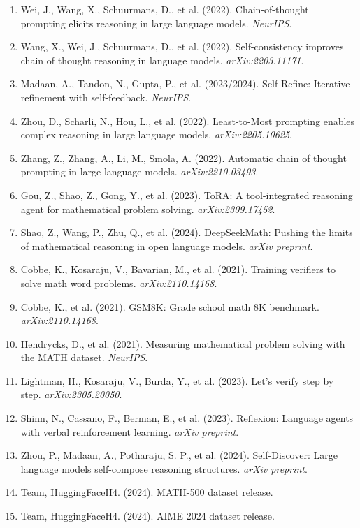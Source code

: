 \documentclass[11pt]{article}
\begin{document}
\begin{enumerate}[leftmargin=*]
    \item Wei, J., Wang, X., Schuurmans, D., et al. (2022). Chain-of-thought prompting elicits reasoning in large language models. \textit{NeurIPS}.
    \item Wang, X., Wei, J., Schuurmans, D., et al. (2022). Self-consistency improves chain of thought reasoning in language models. \textit{arXiv:2203.11171}.
    \item Madaan, A., Tandon, N., Gupta, P., et al. (2023/2024). Self-Refine: Iterative refinement with self-feedback. \textit{NeurIPS}.
    \item Zhou, D., Scharli, N., Hou, L., et al. (2022). Least-to-Most prompting enables complex reasoning in large language models. \textit{arXiv:2205.10625}.
    \item Zhang, Z., Zhang, A., Li, M., Smola, A. (2022). Automatic chain of thought prompting in large language models. \textit{arXiv:2210.03493}.
    \item Gou, Z., Shao, Z., Gong, Y., et al. (2023). ToRA: A tool-integrated reasoning agent for mathematical problem solving. \textit{arXiv:2309.17452}.
    \item Shao, Z., Wang, P., Zhu, Q., et al. (2024). DeepSeekMath: Pushing the limits of mathematical reasoning in open language models. \textit{arXiv preprint}.
    \item Cobbe, K., Kosaraju, V., Bavarian, M., et al. (2021). Training verifiers to solve math word problems. \textit{arXiv:2110.14168}.
    \item Cobbe, K., et al. (2021). GSM8K: Grade school math 8K benchmark. \textit{arXiv:2110.14168}.
    \item Hendrycks, D., et al. (2021). Measuring mathematical problem solving with the MATH dataset. \textit{NeurIPS}.
    \item Lightman, H., Kosaraju, V., Burda, Y., et al. (2023). Let's verify step by step. \textit{arXiv:2305.20050}.
    \item Shinn, N., Cassano, F., Berman, E., et al. (2023). Reflexion: Language agents with verbal reinforcement learning. \textit{arXiv preprint}.
    \item Zhou, P., Madaan, A., Potharaju, S. P., et al. (2024). Self-Discover: Large language models self-compose reasoning structures. \textit{arXiv preprint}.
    \item Team, HuggingFaceH4. (2024). MATH-500 dataset release.
    \item Team, HuggingFaceH4. (2024). AIME 2024 dataset release.
\end{enumerate}
\end{document}
